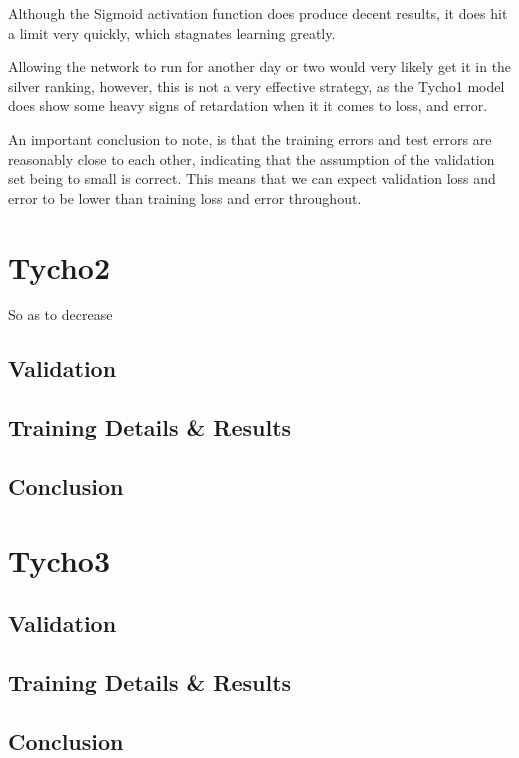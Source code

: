 \documentclass[12pt,a4paper,oneside,oldfontcommands]{memoir}
\begin{document}
Although the Sigmoid activation function does produce decent results, it does hit a limit very quickly, which stagnates
learning greatly.

Allowing the network to run for another day or two would very likely get it in the silver ranking, however, this is not a very effective strategy, as the Tycho1 model does show some heavy signs of retardation when it it comes to loss, and error.

An important conclusion to note, is that the training errors and test errors are reasonably close to each other, indicating that the assumption of the validation set being to small is correct. This means that we can expect validation loss and error to be lower than training loss and error throughout.

\chapter{Tycho2}

So as to decrease 

\section{Validation}

\section{Training Details & Results}

\section{Conclusion}

\chapter{Tycho3}

\section{Validation}

\section{Training Details & Results}

\section{Conclusion}
\end{document}
